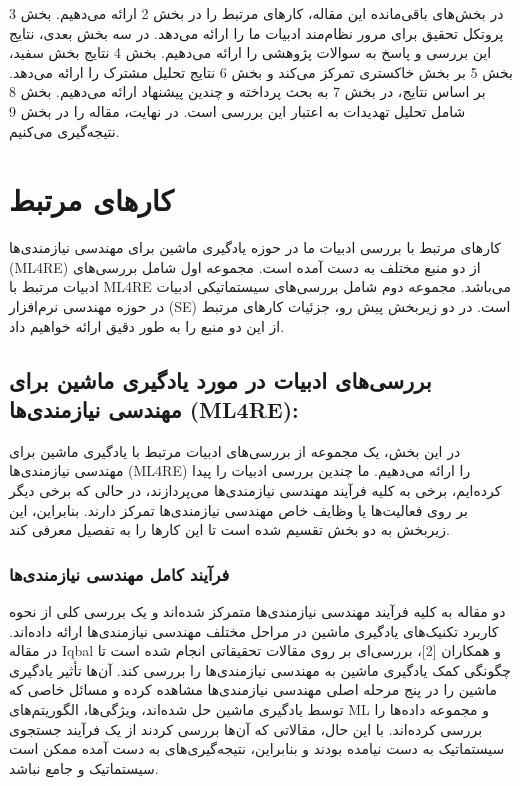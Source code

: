 \documentclass[a4paper,10pt]{article}
\begin{document}
    در بخش‌های باقی‌مانده این مقاله، کارهای مرتبط را در بخش 2 ارائه می‌دهیم. بخش 3 پروتکل تحقیق برای مرور نظام‌مند ادبیات ما را ارائه می‌دهد. در سه بخش بعدی، نتایج این بررسی و پاسخ به سوالات پژوهشی را ارائه می‌دهیم. بخش 4 نتایج بخش سفید، بخش 5 بر بخش خاکستری تمرکز می‌کند و بخش 6 نتایج تحلیل مشترک را ارائه می‌دهد. بر اساس نتایج، در بخش 7 به بحث پرداخته و چندین پیشنهاد ارائه می‌دهیم. بخش 8 شامل تحلیل تهدیدات به اعتبار این بررسی است. در نهایت، مقاله را در بخش 9 نتیجه‌گیری می‌کنیم.
    

    \section{کارهای مرتبط}

    کارهای مرتبط با بررسی ادبیات ما در حوزه یادگیری ماشین برای مهندسی نیازمندی‌ها (ML4RE) از دو منبع مختلف به دست آمده است. مجموعه اول شامل بررسی‌های ادبیات مرتبط با ML4RE می‌باشد. مجموعه دوم شامل بررسی‌های سیستماتیکی ادبیات در حوزه مهندسی نرم‌افزار (SE) است. در دو زیربخش پیش رو، جزئیات کارهای مرتبط از این دو منبع را به طور دقیق ارائه خواهیم داد.

        \subsection{بررسی‌های ادبیات در مورد یادگیری ماشین برای مهندسی نیازمندی‌ها (ML4RE):}

            در این بخش، یک مجموعه از بررسی‌های ادبیات مرتبط با یادگیری ماشین برای مهندسی نیازمندی‌ها (ML4RE) را ارائه می‌دهیم. ما چندین بررسی ادبیات را پیدا کرده‌ایم، برخی به کلیه فرآیند مهندسی نیازمندی‌ها می‌پردازند، در حالی که برخی دیگر بر روی فعالیت‌ها یا وظایف خاص مهندسی نیازمندی‌ها تمرکز دارند. بنابراین، این زیربخش به دو بخش تقسیم شده است تا این کارها را به تفصیل معرفی کند.

            \subsubsection{فرآیند کامل مهندسی نیازمندی‌ها}

                دو مقاله به کلیه فرآیند مهندسی نیازمندی‌ها متمرکز شده‌اند و یک بررسی کلی از نحوه کاربرد تکنیک‌های یادگیری ماشین در مراحل مختلف مهندسی نیازمندی‌ها ارائه داده‌اند. در مقاله Iqbal و همکاران [2]، بررسی‌ای بر روی مقالات تحقیقاتی انجام شده است تا چگونگی کمک یادگیری ماشین به مهندسی نیازمندی‌ها را بررسی کند. آن‌ها تأثیر یادگیری ماشین را در پنج مرحله اصلی مهندسی نیازمندی‌ها مشاهده کرده و مسائل خاصی که توسط یادگیری ماشین حل شده‌اند، ویژگی‌ها، الگوریتم‌های ML و مجموعه داده‌ها را بررسی کرده‌اند. با این حال، مقالاتی که آن‌ها بررسی کردند از یک فرآیند جستجوی سیستماتیک به دست نیامده بودند و بنابراین، نتیجه‌گیری‌های به دست آمده ممکن است سیستماتیک و جامع نباشد.
\end{document}
